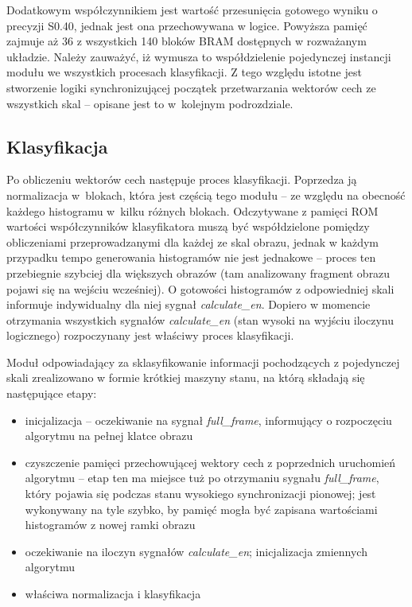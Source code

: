 Dodatkowym współczynnikiem jest wartość przesunięcia gotowego wyniku o precyzji S0.40, jednak jest ona przechowywana w logice. 
Powyższa pamięć zajmuje aż 36 z wszystkich 140 bloków BRAM dostępnych w rozważanym układzie. 
Należy zauważyć, iż wymusza to współdzielenie pojedynczej instancji modułu we wszystkich procesach klasyfikacji. 
Z tego względu istotne jest stworzenie logiki synchronizującej początek przetwarzania wektorów cech ze wszystkich skal -- opisane jest to w~kolejnym podrozdziale.

\subsection{Klasyfikacja}


Po obliczeniu wektorów cech następuje proces klasyfikacji. 
Poprzedza ją normalizacja w~blokach, która jest częścią tego modułu -- ze względu na obecność każdego histogramu w~kilku różnych blokach. 
Odczytywane z pamięci ROM wartości współczynników klasyfikatora muszą być współdzielone pomiędzy obliczeniami przeprowadzanymi dla każdej ze skal obrazu, jednak w każdym przypadku tempo generowania histogramów nie jest jednakowe -- proces ten przebiegnie szybciej dla większych obrazów (tam analizowany fragment obrazu pojawi się na wejściu wcześniej). 
O gotowości histogramów z odpowiedniej skali informuje indywidualny dla niej sygnał \textit{calculate\_en}. 
Dopiero w momencie otrzymania wszystkich sygnałów \textit{calculate\_en} (stan wysoki na wyjściu iloczynu logicznego) rozpoczynany jest właściwy proces klasyfikacji.

Moduł odpowiadający za sklasyfikowanie informacji pochodzących z pojedynczej skali zrealizowano w formie krótkiej maszyny stanu, na którą składają się następujące etapy:
\begin{itemize}
	\item inicjalizacja -- oczekiwanie na sygnał \textit{full\_frame}, informujący o rozpoczęciu algorytmu na pełnej klatce obrazu
	\item czyszczenie pamięci przechowującej wektory cech z poprzednich uruchomień algorytmu -- etap ten ma miejsce tuż po otrzymaniu sygnału \textit{full\_frame}, który pojawia się podczas stanu wysokiego synchronizacji pionowej; jest wykonywany na tyle szybko, by pamięć mogła być  zapisana wartościami histogramów z nowej ramki obrazu 
	\item oczekiwanie na iloczyn sygnałów \textit{calculate\_en}; inicjalizacja zmiennych algorytmu
	\item właściwa normalizacja i klasyfikacja
\end{itemize}

